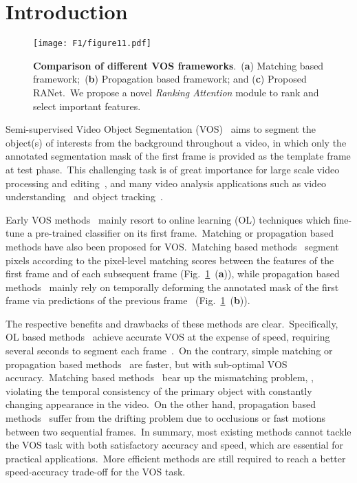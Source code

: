 \documentclass[10pt,twocolumn,letterpaper]{article}
\begin{document}
\section{Introduction}
\begin{figure}[t]
\vspace{-2mm}
\begin{center}
\texttt{[image: F1/figure11.pdf]}
\end{center}
\vspace{-6mm}
\caption{\textbf{Comparison of different VOS frameworks}.\ (\textbf{a}) Matching based framework;\ (\textbf{b}) Propagation based framework; and (\textbf{c}) Proposed RANet.\ We propose a novel \textsl{Ranking Attention} module to rank and select important features.}
\label{fig:intro}
\vspace{-6mm}
\end{figure}

Semi-supervised Video Object Segmentation (VOS)~\cite{davis2016,davis2017,davis2018} aims to segment the object(s) of interests from the background throughout a video, in which only the annotated segmentation mask of the first frame is provided as the template frame at test phase.\ This challenging task is of great importance for large scale video processing and editing~\cite{semi02,semi01,zsvos}, and many video analysis applications such as video understanding~\cite{Fan2019VideoSal,un02} and object tracking~\cite{siammask}.\ 

Early VOS methods~\cite{osvos, masktrack, osvos-s, onavos} mainly resort to online learning (OL) techniques which fine-tune a pre-trained classifier on its first frame.\ Matching or propagation based methods have also been proposed for VOS.\ Matching based methods~\cite{videomatch, pml} segment pixels according to the pixel-level matching scores between the features of the first frame and of each subsequent frame (Fig.~\ref{fig:intro}\ (\textbf{a})), while propagation based methods~\cite{masktrack, rgmp, favos, osmn, sfl, semi02} mainly rely on temporally deforming the annotated mask of the first frame via predictions of the previous frame~\cite{masktrack} (Fig.~\ref{fig:intro}\ (\textbf{b})).

The respective benefits and drawbacks of these methods are clear.\ Specifically, OL based methods~\cite{osvos, masktrack, osvos-s, onavos} achieve accurate VOS at the expense of speed, requiring several seconds to segment each frame~\cite{osvos}.\ On the contrary, simple matching or propagation based methods~\cite{masktrack,pml,plm} are faster, but with sub-optimal VOS accuracy.\ Matching based methods~\cite{videomatch, pml, rgmp} bear up the mismatching problem, \ie, violating the temporal consistency of the primary object with constantly changing appearance in the video.\ On the other hand, propagation based methods~\cite{masktrack, rgmp, favos, osmn, sfl, ofl} suffer from the drifting problem due to occlusions or fast motions between two sequential frames.\ In summary, most existing methods cannot tackle the VOS task with both satisfactory accuracy and speed, which are essential for practical applications.\ More efficient methods are still required to reach a better speed-accuracy trade-off for the VOS task. 
\end{document}
